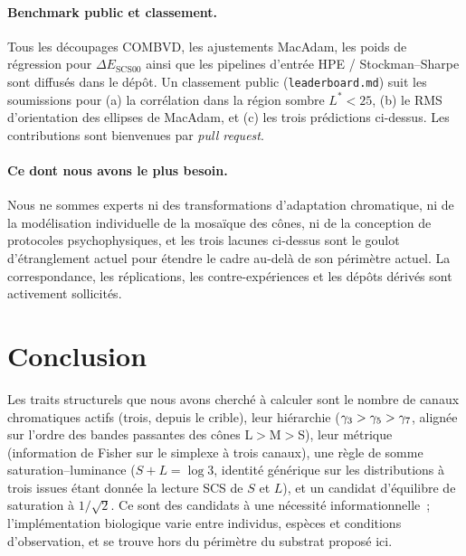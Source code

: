 \documentclass[12pt,a4paper]{article}
\begin{document}
\paragraph{Benchmark public et classement.}
Tous les d\'ecoupages COMBVD, les ajustements MacAdam, les poids de
r\'egression pour $\Delta E_{\mathrm{SCS00}}$ ainsi que les pipelines
d'entr\'ee HPE / Stockman--Sharpe sont diffus\'es dans le d\'ep\^ot.
Un classement public (\texttt{leaderboard.md}) suit les soumissions
pour (a) la corr\'elation dans la r\'egion sombre $L^* < 25$, (b) le
RMS d'orientation des ellipses de MacAdam, et (c) les trois
pr\'edictions ci-dessus. Les contributions sont bienvenues par
\emph{pull request}.

\paragraph{Ce dont nous avons le plus besoin.}
Nous ne sommes experts ni des transformations d'adaptation
chromatique, ni de la mod\'elisation individuelle de la mosa\"ique des
c\^ones, ni de la conception de protocoles psychophysiques, et les
trois lacunes ci-dessus sont le goulot d'\'etranglement actuel pour
\'etendre le cadre au-del\`a de son p\'erim\`etre actuel. La
correspondance, les r\'eplications, les contre-exp\'eriences et les
d\'ep\^ots d\'eriv\'es sont activement sollicit\'es.

\section{Conclusion}
\label{sec:conclusion}

Les traits structurels que nous avons cherch\'e \`a calculer sont le
nombre de canaux chromatiques actifs (trois, depuis le crible), leur
hi\'erarchie ($\gamma_{3} > \gamma_{5} > \gamma_{7}$, align\'ee sur l'ordre
des bandes passantes des c\^ones L$>$M$>$S), leur m\'etrique
(information de Fisher sur le simplexe \`a trois canaux), une r\`egle
de somme saturation--luminance ($S + L = \log 3$, identit\'e
g\'en\'erique sur les distributions \`a trois issues \'etant donn\'ee
la lecture SCS de $S$ et $L$), et un candidat d'\'equilibre de
saturation \`a $1/\sqrt{2}$. Ce sont des candidats \`a une
n\'ecessit\'e informationnelle~; l'impl\'ementation biologique varie
entre individus, esp\`eces et conditions d'observation, et se trouve
hors du p\'erim\`etre du substrat propos\'e ici.
\end{document}

